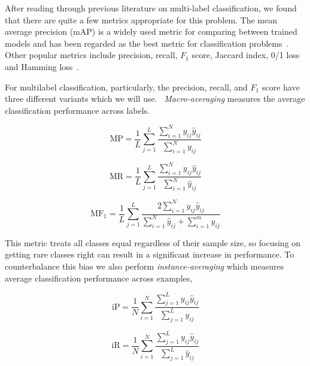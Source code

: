 \documentclass[12pt,journal,compsoc]{IEEEtran}
\begin{document}


After reading through previous literature on multi-label classification, we found that there are quite a few metrics appropriate for this problem. The mean average precision (mAP) is a widely used metric for comparing between trained models and has been regarded as the best metric for classification problems~\cite{Lavrenko_2014}.  Other popular metrics include precision, recall, $F_1$ score, Jaccard index, 0/1 loss and Hamming loss~\cite{Tsoumakas:2007,SOKOLOVA2009427,Herrera:2016}. 

For multilabel classification, particularly, the precision, recall, and $F_1$ score have three different variants which we will use.~\cite{MADJAROV20123084,WuZ16,Koyejo:2015}  \textit{Macro-averaging} measures the average classification performance across labels.  

\begin{equation}
\mathrm{MP} = \frac{1}{L}\sum_{j=1}^{L}\frac{\sum_{i=1}^{N}y_{ij}\hat{y}_{ij}}{\sum_{i=1}^{N}y_{ij}}
\label{eq:MP}
\end{equation}

\begin{equation}
\mathrm{MR} = \frac{1}{L}\sum_{j=1}^{L}\frac{\sum_{i=1}^{N}y_{ij}\hat{y}_{ij}}{\sum_{i=1}^{N}\hat{y}_{ij}}
\label{eq:MR}
\end{equation}

\begin{equation}
\mathrm{MF_1} = \frac{1}{L}\sum_{j=1}^{L}\frac{2\sum_{i=1}^{N}y_{ij}\hat{y}_{ij}}{\sum_{i=1}^{N}\hat{y}_{ij}+\sum_{i=1}^{m}y_{ij}}
\label{eq:MF1}
\end{equation}

This metric treats all classes equal regardless of their sample size, so focusing on getting rare classes right can result in a significant increase in performance. To counterbalance this bias we also perform \textit{instance-averaging} which measures average classification performance across examples,

\begin{equation}
\mathrm{iP} = \frac{1}{N}\sum_{i=1}^{N}\frac{\sum_{j=1}^{L}y_{ij}\hat{y}_{ij}}{\sum_{j=1}^{L}y_{ij}}
\label{eq:iP}
\end{equation}

\begin{equation}
\mathrm{iR} = \frac{1}{N}\sum_{i=1}^{N}\frac{\sum_{j=1}^{L}y_{ij}\hat{y}_{ij}}{\sum_{j=1}^{L}\hat{y}_{ij}}
\label{eq:iR}
\end{equation}
\end{document}

